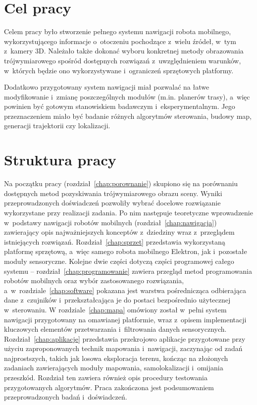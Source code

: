 \section{Cel pracy}

Celem pracy było stworzenie pełnego systemu nawigacji robota mobilnego,
wykorzystującego informacje o~otoczeniu pochodzące z~wielu źródeł, w~tym z~kamery 3D.
Należało także dokonać wyboru konkretnej metody obrazowania trójwymiarowego
spośród dostępnych rozwiązań z~uwzględnieniem warunków, w~których będzie ono
wykorzystywane i~ograniczeń sprzętowych platformy.

Dodatkowo przygotowany system nawigacji miał pozwalać na łatwe modyfikowanie
i~zmianę poszczególnych modułów (m.in. planerów trasy), a~więc powinien być
gotowym stanowiskiem badawczym i~eksperymentalnym. Jego przeznaczeniem miało
być badanie różnych algorytmów sterowania, budowy map, generacji trajektorii czy lokalizacji.


\section{Struktura pracy}

Na początku pracy (rozdział~\ref{chap:porownanie}) skupiono się na porównaniu
dostępnych metod pozyskiwania trójwymiarowego
obrazu sceny. Wyniki przeprowadzonych doświadczeń pozwoliły wybrać docelowe rozwiązanie
wykorzystane przy realizacji zadania. Po nim następuje
teoretyczne wprowadzenie w~podstawy nawigacji robotów mobilnych (rozdział~\ref{chap:nawigacja})
zawierający opis najważniejszych konceptów z~dziedziny wraz z~przeglądem istniejących
rozwiązań. Rozdział~\ref{chap:sprzet} przedstawia wykorzystaną platformę sprzętową,
a~więc samego robota mobilnego Elektron, jak i~pozostałe moduły sensoryczne. Kolejne
dwie części dotyczą części programowej całego systemu -- rozdział~\ref{chap:programowanie}
zawiera przegląd metod programowania robotów mobilnych oraz wybór zastosowanego rozwiązania,
a~w~rozdziale~\ref{chap:software} pokazana jest warstwa pośrednicząca odbierająca
dane z~czujników i~przekształcająca je do postaci bezpośrednio użytecznej w~sterowaniu.
W rozdziale~\ref{chap:mapa} omówiony został w~pełni system nawigacji przygotowany
na omawianej platformie, wraz z~opisem implementacji kluczowych elementów
przetwarzania i~filtrowania danych sensorycznych.
Rozdział~\ref{chap:aplikacje} przedstawia przekrojowo aplikacje przygotowane
przy użyciu zaproponowanych technik mapowania i~nawigacji, zaczynając od zadań
najprostszych, takich jak losowa eksploracja terenu, kończąc na złożonych zadaniach
zawierających moduły mapowania, samolokalizacji i~omijania przeszkód. Rozdział ten
zawiera również opis procedury testowania przygotowanych algorytmów. Praca zakończona
jest podsumowaniem przeprowadzonych badań i~doświadczeń.


